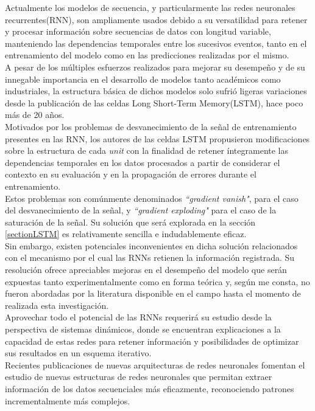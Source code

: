 \documentclass{article}
\begin{document}
	
	Actualmente los modelos de secuencia, y particularmente las redes neuronales recurrentes(RNN), son ampliamente usados debido a su versatilidad para retener y procesar información sobre secuencias de datos con longitud variable, manteniendo las dependencias temporales entre los sucesivos eventos, tanto en el entrenamiento del modelo como en las predicciones realizadas por el mismo.\\
	A pesar de los múltiples esfuerzos realizados para mejorar su desempeño\cite{16ForgateGatePeepholeConnectionsGers} y de su innegable importancia en el desarrollo de modelos tanto académicos\cite{15TransductionGraves, 43ParsingScenesRecursively, 44SpeechRecognition, 52MachineTranslationAttentionRNN} como industriales\cite{12DeepSearch, 13SpeechRecognition, 14RegularizationZaremba, 51SequenceToSequenceMachineTranslation, 56MicrosoftSpeechRecognition}, la estructura básica de dichos modelos solo sufrió ligeras variaciones desde la publicación de las celdas Long Short-Term Memory(LSTM), hace poco más de 20 años\cite{42FormerLSTMHochreiter}. \\
	Motivados por los problemas de desvanecimiento de la señal de entrenamiento presentes en las RNN, los autores de las celdas LSTM propusieron modificaciones sobre la estructura de cada \textit{unit} con la finalidad de retener íntegramente las dependencias temporales en los datos procesados a partir de considerar el contexto en su evaluación y en la propagación de errores durante el entrenamiento\cite{42FormerLSTMHochreiter}.\\
	Estos problemas son comúnmente denominados \textit{``gradient vanish"}, para el caso del desvanecimiento de la señal, y  \textit{``gradient exploding"} para el caso de la saturación de la señal. Su solución que será explorada en la sección \ref{sectionLSTM} es relativamente sencilla e indudablemente eficaz.\\
	
	Sin embargo, existen potenciales inconvenientes en dicha solución relacionados con el mecanismo por el cual las RNNs retienen la información registrada. Su resolución ofrece apreciables mejoras en el desempeño del modelo que serán expuestas tanto experimentalmente como en forma teórica y, según me consta, no fueron abordadas por la literatura disponible en el campo hasta el momento de realizada esta investigación.\\
	Aprovechar todo el potencial de las RNNs requerirá su estudio desde la perspectiva de sistemas dinámicos, donde se encuentran explicaciones a la capacidad de estas redes para retener información y posibilidades de optimizar sus resultados en un esquema iterativo.\\
	Recientes publicaciones de nuevas arquitecturas de redes neuronales \cite{1GANs, 18DifferentiableNeuralComputer} fomentan el estudio de nuevas estructuras de redes neuronales que permitan extraer información de los datos secuenciales más eficazmente, reconociendo patrones incrementalmente más complejos.\\
	
\end{document}
